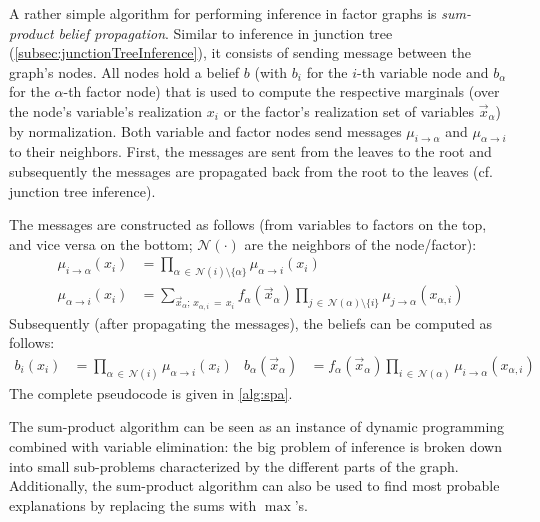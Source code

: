 		A rather simple algorithm for performing inference in factor graphs is \emph{sum-product belief propagation}. Similar to inference in junction tree (\autoref{subsec:junctionTreeInference}), it consists of sending message between the graph's nodes. All nodes hold a belief \(b\) (with \(b_i\) for the \(i\)-th variable node and \(b_\alpha\) for the \(\alpha\)-th factor node) that is used to compute the respective marginals (over the node's variable's realization \(x_i\) or the factor's realization set of variables \(\vec{x}_\alpha\)) by normalization. Both variable and factor nodes send messages \(\mu_{i \to \alpha}\) and \(\mu_{\alpha \to i}\) to their neighbors. First, the messages are sent from the leaves to the root and subsequently the messages are propagated back from the root to the leaves (cf. junction tree inference).

		The messages are constructed as follows (from variables to factors on the top, and vice versa on the bottom; \(\mathcal{N}(\cdot)\) are the neighbors of the node/factor):
		\begin{align}
			\mu_{i \to \alpha}(x_i) &= \prod_{\alpha \,\in\, \mathcal{N}(i) \setminus \{ \alpha \}} \mu_{\alpha \to i}(x_i) \\
			\mu_{\alpha \to i}(x_i) &= \sum_{\vec{x}_\alpha;\, x_{\alpha, i} \,=\, x_i} f_\alpha(\vec{x}_\alpha) \prod_{j \,\in\, \mathcal{N}(\alpha) \setminus \{ i \}} \mu_{j \to \alpha}(x_{\alpha, i})
		\end{align}
		Subsequently (after propagating the messages), the beliefs can be computed as follows:
		\begin{align}
			b_i(x_i) &= \prod_{\alpha \,\in\, \mathcal{N}(i)} \mu_{\alpha \to i}(x_i) &
			b_\alpha(\vec{x}_\alpha) &= f_\alpha(\vec{x}_\alpha) \prod_{i \,\in\, \mathcal{N}(\alpha)} \mu_{i \to \alpha}(x_{\alpha, i})
		\end{align}
		The complete pseudocode is given in \autoref{alg:spa}.

		The sum-product algorithm can be seen as an instance of dynamic programming combined with variable elimination: the big problem of inference is broken down into small sub-problems characterized by the different parts of the graph. Additionally, the sum-product algorithm can also be used to find most probable explanations by replacing the sums with \(\max\)'s.

